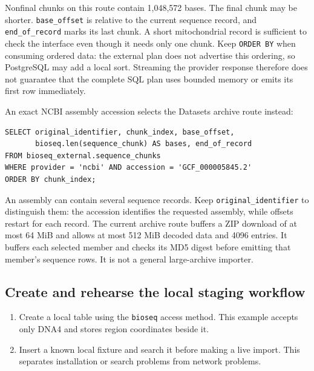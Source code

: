 Nonfinal chunks on this route contain 1,048,572 bases. The final chunk may be
shorter. \texttt{base\_offset} is relative to the current sequence record,
and \texttt{end\_of\_record} marks its last chunk. A short mitochondrial
record is sufficient to check the interface even though it needs only one
chunk. Keep \texttt{ORDER BY} when consuming ordered data: the external plan
does not advertise this ordering, so PostgreSQL may add a local sort.
Streaming the provider response therefore does not guarantee that the
complete SQL plan uses bounded memory or emits its first row immediately.

An exact NCBI assembly accession selects the Datasets archive route instead:

\par\noindent\begin{minipage}{\linewidth}
\begin{lstlisting}[style=bioseq-appendix-sql]
SELECT original_identifier, chunk_index, base_offset,
       bioseq.len(sequence_chunk) AS bases, end_of_record
FROM bioseq_external.sequence_chunks
WHERE provider = 'ncbi' AND accession = 'GCF_000005845.2'
ORDER BY chunk_index;
\end{lstlisting}
\end{minipage}

An assembly can contain several sequence records. Keep
\texttt{original\_identifier} to distinguish them: the accession identifies
the requested assembly, while offsets restart for each record. The current
archive route buffers a ZIP download of at most 64 MiB and allows at most
512 MiB decoded data and 4096 entries. It buffers each selected member and
checks its MD5 digest before emitting that member's sequence rows. It is not
a general large-archive importer.

\subsection{Create and rehearse the local staging workflow}
\label{app-remote-stage}

\begin{enumerate}
  \item Create a local table using the \texttt{bioseq} access method. This
        example accepts only DNA4 and stores region coordinates beside it.
  \item Insert a known local fixture and search it before making a live
        import. This separates installation or search problems from network
        problems.
\end{enumerate}

